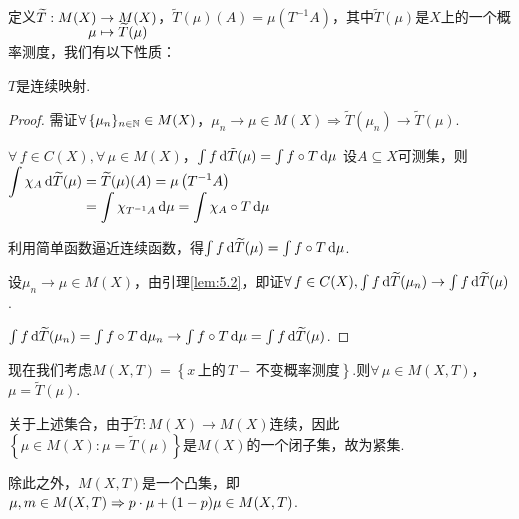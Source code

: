 定义$ \setjot[-4]\begin{aligned}[t]
    \widetilde{T}:M(X)&\to M(X) \\
    \mu&\mapsto \widetilde{T}(\mu)
\end{aligned}$，$\widetilde{T}(\mu)(A)=\mu\left(T^{-1}A\right)$，其中$\widetilde{T}(\mu)$是$X$上的一个概率测度，我们有以下性质：
\begin{proposition}{}
    $T$是连续映射.
\end{proposition}
\begin{proof}
    需证$\forall\,\{\mu_n\}_{n\in\mathbb{N}}\in M(X)$，$\mu_n\to\mu\in M(X)\Rightarrow \widetilde{T}(\mu_n)\to \widetilde{T}(\mu)$.\par
    \begin{claim}{$\forall\, f\in C(X),\forall\,\mu\in M(X)$，$\int f\mathop{}\!\mathrm{d}\tilde{T}(\mu)=\int f\circ T\mathop{}\!\mathrm{d}\mu$}
        设$A\subseteq X$可测集，则$\setjot[-5]\begin{aligned}[t]
            \int\chi_A\d\widetilde{T}(\mu)&=\widetilde{T}(\mu)(A)=\mu\left(T^{-1}A\right) \\
            &=\int\chi_{T^{-1}A}\d\mu=\int\chi_A\circ T\d\mu
        \end{aligned}$\par
        利用简单函数逼近连续函数，得$\int f\mathop{}\!\mathrm{d}\widetilde{T}(\mu)=\int{f\circ T}\mathop{}\!\mathrm{d}\mu$.
    \end{claim}\par
    设$\mu_n\to\mu\in M(X)$，由引理\ref{lem:5.2}，即证$\forall\, f\in C(X),\int f\mathop{}\!\mathrm{d}\widetilde{T}(\mu_n)\to \int{f}\mathop{}\!\mathrm{d}\widetilde{T}(\mu)$.\par
    $\int{f}\mathop{}\!\mathrm{d}\widetilde{T}(\mu_n)=\int{f\circ T}\mathop{}\!\mathrm{d}\mu_n\to \int{f\circ T}\mathop{}\!\mathrm{d}\mu=\int{f}\mathop{}\!\mathrm{d}\widetilde{T}(\mu)$.
\end{proof}

现在我们考虑$M(X,T)=\left\{x\,\text{上的}\,T-\,\text{不变概率测度}\right\}$.则$\forall\, \mu\in M(X,T)$，$\mu=\widetilde{T}(\mu)$.\par
关于上述集合，由于$\widetilde{T}:M(X)\to M(X)$连续，因此$\left\{\mu\in M(X):\mu=\widetilde{T}(\mu)\right\}$是$M(X)$的一个闭子集，故为紧集.\par
除此之外，$M(X,T)$是一个凸集，即$\mu,m\in M(X,T)\Rightarrow p\cdot\mu+(1-p)\mu\in M(X,T)$.\par


